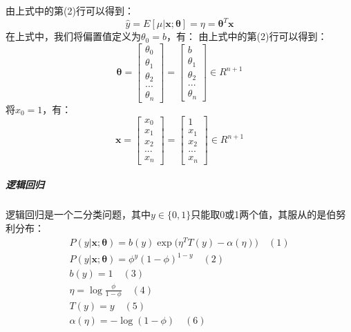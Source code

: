 \documentclass[UTF8]{article}
\begin{document}
由上式中的第(2)行可以得到：
\begin{equation}
\hat{y} = E[\mu \vert \boldsymbol{x}; \boldsymbol{\theta}] = \eta = \boldsymbol{\theta} ^{T} \boldsymbol{x}
\label{lcrn-gml-linear-regression-summary-yhat}
\end{equation}
在上式中，我们将偏置值定义为$\theta _{0}=b$，有：
由上式中的第(2)行可以得到：
\begin{equation}
\boldsymbol{\theta} = \begin{bmatrix}
\theta _{0} \\
\theta _{1} \\
\theta _{2} \\
... \\
\theta _{n} 
\end{bmatrix} = \begin{bmatrix}
b \\
\theta _{1} \\
\theta _{2} \\
... \\
\theta _{n} 
\end{bmatrix} \in R^{n+1}
\label{lcrn-gml-linear-regression-summary-theta-b}
\end{equation}
将$x_{0} = 1$，有：
\begin{equation}
\boldsymbol{x} = \begin{bmatrix}
x_{0} \\
x_{1} \\
x_{2} \\
... \\
x _{n} 
\end{bmatrix} = \begin{bmatrix}
1 \\
x_{1} \\
x_{2} \\
... \\
x _{n} 
\end{bmatrix} \in R^{n+1}
\label{lcrn-gml-linear-regression-summary-x0}
\end{equation}
\subparagraph{逻辑回归}
逻辑回归是一个二分类问题，其中$y \in \{0, 1\}$只能取0或1两个值，其服从的是伯努利分布：
\begin{equation}
\begin{aligned}
P(y \vert \boldsymbol{x}; \boldsymbol{\theta}) = b(y)\exp \Big( \eta ^{T}T(y) - \alpha(\eta) \Big)  \quad (1)\\
P(y \vert \boldsymbol{x}; \boldsymbol{\theta}) = \phi ^{y} (1-\phi)^{1-y} \quad (2) \\
b(y) = 1 \quad (3) \\
\eta = \log \frac{\phi}{1-\phi} \quad (4) \\
T(y) = y \quad (5) \\
\alpha(\eta) = - \log (1-\phi) \quad (6)
\end{aligned}
\label{lcrn-gml-logistic-regression-summary}
\end{equation}
\end{document}
